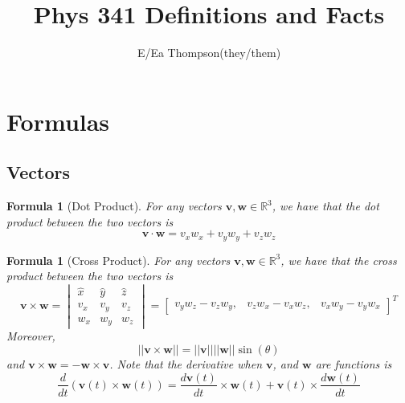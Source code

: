 \documentclass[12pt]{article}
\newtheorem{for}[thm]{Formula}
\theoremstyle{definition}
\theoremstyle{remark}
\numberwithin{equation}{section}
\newcommand\R{\mathbb R}    %
\newcommand\B[1]{\textbf{#1}}
\begin{document}

\title{Phys 341 Definitions and Facts}
\author{E/Ea Thompson(they/them)}
\maketitle

\tableofcontents



\section{Formulas}

\subsection{Vectors}


\begin{for}[Dot Product]
        For any vectors $\B{v},\B{w} \in \R^3$, we have that the dot product between the two vectors is 
        \begin{equation}
                \B{v}\cdot\B{w} = v_xw_x+v_yw_y+v_zw_z
        \end{equation}
\end{for}


\vspace{15pt}

\begin{for}[Cross Product]
        For any vectors $\B{v},\B{w} \in \R^3$, we have that the cross product between the two vectors is 
        \begin{equation}
                \B{v}\times\B{w} = \begin{vmatrix} \hat{x} & \hat{y} & \hat{z} \\
                        v_x & v_y & v_z \\
                        w_x & w_y & w_z 
                \end{vmatrix} = 
                        \begin{bmatrix} v_yw_z - v_zw_y, & v_zw_x - v_xw_z, & v_xw_y - v_yw_x
                \end{bmatrix}^T
        \end{equation}
        Moreover, \begin{equation}
                ||\B{v}\times\B{w}|| = ||\B{v}||||\B{w}||\sin(\theta)
        \end{equation}
        and $\B{v}\times \B{w} = -\B{w} \times \B{v}$. Note that the derivative when $\B{v}$, and $\B{w}$ are functions is \begin{equation}
                \frac{d}{dt}(\B{v}(t)\times \B{w}(t)) = \frac{d\B{v}(t)}{dt}\times\B{w}(t) + \B{v}(t)\times \frac{d\B{w}(t)}{dt}
        \end{equation}
\end{for}
\end{document}
